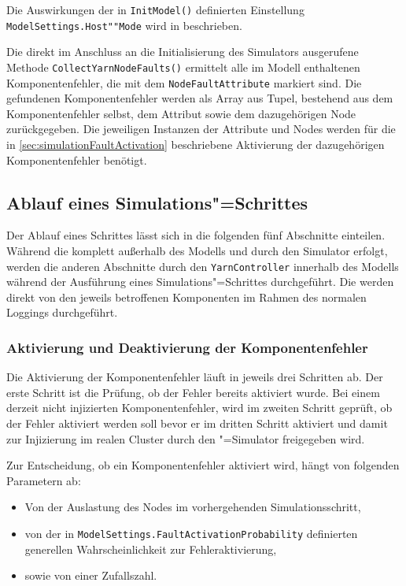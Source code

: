 Die Auswirkungen der in \texttt{InitModel()} definierten Einstellung \texttt{ModelSettings.Host""Mode} wird in  beschrieben.

Die direkt im Anschluss an die Initialisierung des Simulators ausgerufene Methode \texttt{CollectYarnNodeFaults()} ermittelt alle im Modell enthaltenen Komponentenfehler, die mit dem \texttt{NodeFaultAttribute} markiert sind.
Die gefundenen Komponentenfehler werden als Array aus Tupel, bestehend aus dem Komponentenfehler selbst, dem Attribut sowie dem dazugehörigen Node zurückgegeben.
Die jeweiligen Instanzen der Attribute und Nodes werden für die in \autoref{sec:simulationFaultActivation} beschriebene Aktivierung der dazugehörigen Komponentenfehler benötigt.

\subsection{Ablauf eines Simulations"=Schrittes}\label{sec:simulationStep}

Der Ablauf eines Schrittes lässt sich in die folgenden fünf Abschnitte einteilen.
Während die  komplett außerhalb des Modells und durch den Simulator erfolgt, werden die anderen Abschnitte durch den \texttt{YarnController} innerhalb des Modells während der Ausführung eines Simulations"=Schrittes durchgeführt.
Die  werden direkt von den jeweils betroffenen Komponenten im Rahmen des normalen Loggings durchgeführt.

\subsubsection{Aktivierung und Deaktivierung der Komponentenfehler}\label{sec:simulationFaultActivation}

Die Aktivierung der Komponentenfehler läuft in jeweils drei Schritten ab.
Der erste Schritt ist die Prüfung, ob der Fehler bereits aktiviert wurde.
Bei einem derzeit nicht injizierten Komponentenfehler, wird im zweiten Schritt geprüft, ob der Fehler aktiviert werden soll bevor er im dritten Schritt aktiviert und damit zur Injizierung im realen Cluster durch den \sS"=Simulator freigegeben wird.

Zur Entscheidung, ob ein Komponentenfehler aktiviert wird, hängt von folgenden Parametern ab:

\begin{itemize}
    \item Von der Auslastung des Nodes im vorhergehenden Simulationsschritt,
    \item von der in \texttt{ModelSettings.FaultActivationProbability} definierten generellen Wahrscheinlichkeit zur Fehleraktivierung,
    \item sowie von einer Zufallszahl.
\end{itemize}

